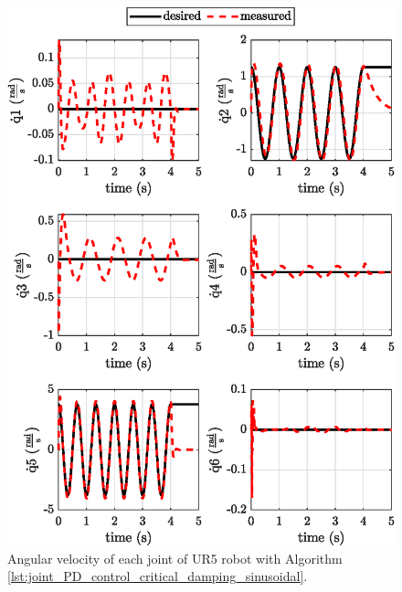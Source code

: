 \begin{figure}
    \centering
    \includegraphics{images/act_1.5_sin/joint_velocity.eps}
    \caption{Angular velocity of each joint of UR5 robot with Algorithm \ref{lst:joint_PD_control_critical_damping_sinusoidal}.}
    \label{fig:act_1.5_sin_joint_velocity}
\end{figure}

